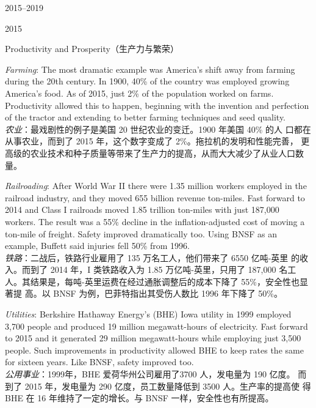 \begin{chapter}{2015--2019}
\begin{section}{2015}
\begin{subsection}{Productivity and Prosperity（生产力与繁荣）}
{\color{green}{此处应为列表项 \\}}

\begin{verseparallel}
  {
    \textit{Farming}: The most dramatic example was America's shift away
    from farming during the 20th century. In 1900, 40\% of the country
    was employed growing America's food. As of 2015, just 2\% of the
    population worked on farms. Productivity allowed this to happen,
    beginning with the invention and perfection of the tractor and
    extending to better farming techniques and seed quality. \\
  }
  {
    \textit{农业}：最戏剧性的例子是美国 20 世纪农业的变迁。1900 年美国 40\% 的人
    口都在从事农业，而到了 2015 年，这个数字变成了 2\%。拖拉机的发明和性能完善，
    更高级的农业技术和种子质量等带来了生产力的提高，从而大大减少了从业人口数量。
  }
\end{verseparallel}

\begin{verseparallel}
  {
    \textit{Railroading}: After World War II there were 1.35 million workers
    employed in the railroad industry, and they moved 655 billion revenue
    ton-miles. Fast forward to 2014 and Class I railroads moved 1.85 trillion
    ton-miles with just 187,000 workers. The result was a 55\% decline in the
    inflation-adjusted cost of moving a ton-mile of freight. Safety improved
    dramatically too. Using BNSF as an example, Buffett said injuries fell 50\%
    from 1996. \\
  }
  {
    \textit{铁路}：二战后，铁路行业雇用了 135 万名工人，他们带来了 6550 亿吨-英里
    的收入。而到了 2014 年，I 类铁路收入为 1.85 万亿吨-英里，只用了 187,000 名工
    人。其结果是，每吨-英里运费在经过通胀调整后的成本下降了 55\%，安全性也显著提
    高。以 BNSF 为例，巴菲特指出其受伤人数比 1996 年下降了 50\%。
  }
\end{verseparallel}

\begin{verseparallel}
  {
    \textit{Utilities}: Berkshire Hathaway Energy's (BHE) Iowa utility in 1999
    employed 3,700 people and produced 19 million megawatt-hours of electricity.
    Fast forward to 2015 and it generated 29 million megawatt-hours while
    employing just 3,500 people. Such improvements in productivity allowed BHE
    to keep rates the same for sixteen years. Like BNSF, safety improved too. \\
  }
  {
    \textit{公用事业}：1999年，BHE 爱荷华州公司雇用了3700 人，发电量为 190 亿度。
    而到了 2015 年，发电量为 290 亿度，员工数量降低到 3500 人。生产率的提高使
    得 BHE 在 16 年维持了一定的增长。与 BNSF 一样，安全性也有所提高。
  }
\end{verseparallel}


\end{subsection}
\end{section}
\end{chapter}
